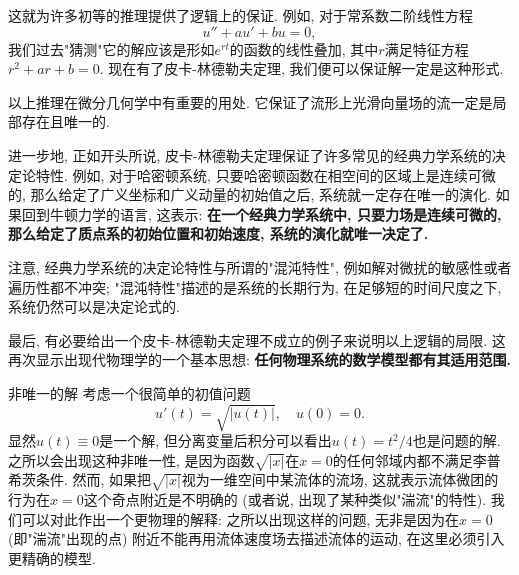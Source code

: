 这就为许多初等的推理提供了逻辑上的保证. 例如, 对于常系数二阶线性方程
$$
u''+au'+bu=0,
$$
我们过去"猜测"它的解应该是形如$e^{rt}$的函数的线性叠加, 其中$r$满足特征方程$r^2+ar+b=0$. 现在有了皮卡-林德勒夫定理, 我们便可以保证解一定是这种形式. 

以上推理在微分几何学中有重要的用处. 它保证了流形上光滑向量场的流一定是局部存在且唯一的.

进一步地, 正如开头所说, 皮卡-林德勒夫定理保证了许多常见的经典力学系统的决定论特性. 例如, 对于哈密顿系统, 只要哈密顿函数在相空间的区域上是连续可微的, 那么给定了广义坐标和广义动量的初始值之后, 系统就一定存在唯一的演化. 如果回到牛顿力学的语言, 这表示: \textbf{在一个经典力学系统中, 只要力场是连续可微的, 那么给定了质点系的初始位置和初始速度, 系统的演化就唯一决定了.}

注意, 经典力学系统的决定论特性与所谓的"混沌特性", 例如解对微扰的敏感性或者遍历性都不冲突; "混沌特性"描述的是系统的长期行为, 在足够短的时间尺度之下, 系统仍然可以是决定论式的.

最后, 有必要给出一个皮卡-林德勒夫定理不成立的例子来说明以上逻辑的局限. 这再次显示出现代物理学的一个基本思想: \textbf{任何物理系统的数学模型都有其适用范围.}
\begin{example}{非唯一的解}
考虑一个很简单的初值问题
$$
u'(t)=\sqrt{|u(t)|},\quad u(0)=0.
$$
显然$u(t)\equiv0$是一个解, 但分离变量后积分可以看出$u(t)=t^2/4$也是问题的解. 之所以会出现这种非唯一性, 是因为函数$\sqrt{|x|}$在$x=0$的任何邻域内都不满足李普希茨条件. 然而, 如果把$\sqrt{|x|}$视为一维空间中某流体的流场, 这就表示流体微团的行为在$x=0$这个奇点附近是不明确的 (或者说, 出现了某种类似"湍流"的特性). 我们可以对此作出一个更物理的解释: 之所以出现这样的问题, 无非是因为在$x=0$ (即"湍流"出现的点) 附近不能再用流体速度场去描述流体的运动, 在这里必须引入更精确的模型.
\end{example}